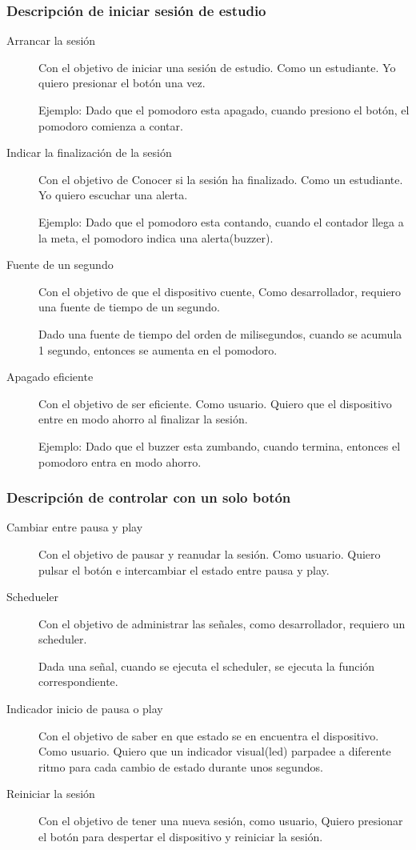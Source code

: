 \documentclass{article}
\begin{document}
\subsubsection{Descripción de iniciar sesión de estudio}
\begin{description}
	\item [Arrancar la sesión] Con el objetivo de iniciar una sesión de 
		estudio. Como un estudiante. Yo quiero presionar el botón una
		vez.

		\CheckedBox Ejemplo: Dado que el pomodoro esta apagado, cuando 
		presiono el
		botón, el pomodoro comienza a contar.
	
	\item [Indicar la finalización de la sesión] Con el objetivo de Conocer
		si la sesión ha finalizado. Como un estudiante. Yo quiero 
		escuchar una alerta.

		\CheckedBox Ejemplo: Dado que el pomodoro esta contando, cuando 
		el contador
		llega a la meta, el pomodoro indica una alerta(buzzer).
	\item [Fuente de un segundo] Con el objetivo de que el dispositivo 
		cuente, Como desarrollador, requiero una fuente de tiempo de
		un segundo.
		
		\CheckedBox Dado una fuente de tiempo del orden de milisegundos,
		cuando se acumula 1 segundo, entonces se aumenta en el pomodoro.

	\item [Apagado eficiente] Con el objetivo de ser eficiente. 
		Como usuario. Quiero que el dispositivo entre en modo ahorro
		al finalizar la sesión.

		\CheckedBox Ejemplo: Dado que el buzzer esta zumbando, cuando 
		termina, entonces el pomodoro entra en modo ahorro.
\end{description}
\subsubsection{Descripción de controlar con un solo botón}
\begin{description}
	\item[Cambiar entre pausa y play] Con el objetivo de pausar y reanudar
		la sesión. Como usuario. Quiero pulsar el botón e intercambiar
		el estado entre pausa y play.

	\item[Schedueler] Con el objetivo de administrar las señales, como
		desarrollador, requiero un scheduler.

		\Square Dada una señal, cuando se ejecuta el scheduler, se
		ejecuta la función correspondiente.

	\item[Indicador inicio de pausa o play] Con el objetivo de saber en que
		estado se en encuentra el dispositivo. Como usuario. Quiero que
		un indicador visual(led) parpadee a diferente ritmo para cada 
		cambio de estado durante unos segundos.
	\item[Reiniciar la sesión] Con el objetivo de tener una nueva sesión, 
		como usuario, Quiero presionar el botón para despertar el 
		dispositivo y reiniciar la sesión.
\end{description}
\end{document}
